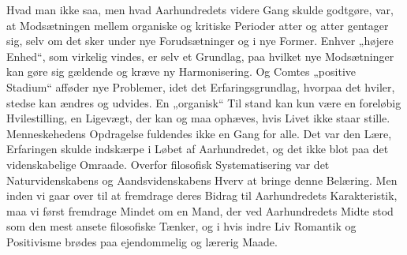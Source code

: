\documentclass[12pt,a4paper,openany]{book}
\newcommand{\opage}[1]{\marginnote{\footnotesize\textit{[#1]}}}
\begin{document}
Hvad man ikke saa, men hvad Aarhundredets videre Gang skulde
godtgøre, var, at Modsætningen mellem organiske og kritiske Perioder
atter og atter gentager sig, selv om det sker under nye Forudsætninger
og i nye Former. Enhver „højere Enhed“, som virkelig
vindes, er selv et Grundlag, paa hvilket nye Modsætninger kan gøre
sig gældende og kræve ny Harmonisering. Og Comtes „positive
Stadium“ afføder nye Problemer, idet det Erfaringsgrundlag, hvorpaa
det hviler, stedse kan ændres og udvides. En „organisk“ Til%
\opage{20}stand kan kun være en foreløbig Hvilestilling, en Ligevægt, der kan
og maa ophæves, hvis Livet ikke staar stille. Menneskehedens Opdragelse
fuldendes ikke en Gang for alle. Det var den Lære, Erfaringen
skulde indskærpe i Løbet af Aarhundredet, og det ikke blot
paa det videnskabelige Omraade. Overfor filosofisk Systematisering
var det Naturvidenskabens og Aandsvidenskabens Hverv at bringe
denne Belæring. Men inden vi gaar over til at fremdrage deres Bidrag
til Aarhundredets Karakteristik, maa vi først fremdrage Mindet
om en Mand, der ved Aarhundredets Midte stod som den mest
ansete filosofiske Tænker, og i hvis indre Liv Romantik og Positivisme
brødes paa ejendommelig og lærerig Maade.
\end{document}
